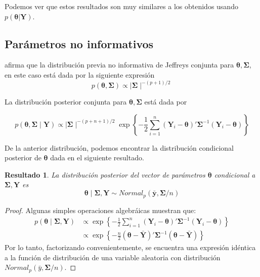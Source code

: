 \documentclass[
  10pt,
  spanish,
]{book}
\newtheorem{proposition}{Resultado}[chapter]
\theoremstyle{definition}
\theoremstyle{definition}
\theoremstyle{definition}
\theoremstyle{definition}
\theoremstyle{remark}
\begin{document}
Podemos ver que estos resultados son muy similares a los obtenidos usando \(p(\boldsymbol \theta|\mathbf{Y})\).

\hypertarget{paruxe1metros-no-informativos-1}{%
\subsection{Parámetros no informativos}\label{paruxe1metros-no-informativos-1}}

\citet{Gelman03} afirma que la distribución previa no informativa de Jeffreys conjunta para \(\boldsymbol \theta,\boldsymbol \Sigma\), en este caso está dada por la siguiente expresión
\begin{equation*}
p(\boldsymbol \theta,\boldsymbol \Sigma)\propto \mid \boldsymbol \Sigma\mid ^{-(p+1)/2}
\end{equation*}

La distribución posterior conjunta para \(\boldsymbol \theta,\boldsymbol \Sigma\) está dada por

\begin{equation*}
p(\boldsymbol \theta,\boldsymbol \Sigma\mid \mathbf{Y})\propto
\mid \boldsymbol \Sigma\mid ^{-(p+n+1)/2}
\exp\left\{ -\frac{1}{2}\sum_{i=1}^n
  (\mathbf{Y}_i-\boldsymbol \theta)'\boldsymbol \Sigma^{-1}(\mathbf{Y}_i-\boldsymbol \theta)\right\}
  \end{equation*}

De la anterior distribución, podemos encontrar la distribución condicional posterior de \(\boldsymbol \theta\) dada en el siguiente resultado.

\begin{proposition}
\protect\hypertarget{prp:unnamed-chunk-54}{}{\label{prp:unnamed-chunk-54} }La distribución posterior del vector de parámetros \(\boldsymbol \theta\) condicional a \(\boldsymbol \Sigma,\mathbf{Y}\) es
\begin{equation*}
\boldsymbol \theta\mid \boldsymbol \Sigma,\mathbf{Y}\sim Normal_p(\bar{\mathbf{y}},\boldsymbol \Sigma/n)
\end{equation*}
\end{proposition}

\begin{proof}
{}Algunas simples operaciones algebráicas muestran que:
\begin{align*}
p(\boldsymbol \theta\mid \boldsymbol \Sigma,\mathbf{Y}) &\propto \exp\left\{ -\frac{1}{2}\sum_{i=1}^n (\mathbf{Y}_i-\boldsymbol \theta)'\boldsymbol \Sigma^{-1}(\mathbf{Y}_i-\boldsymbol \theta)\right\}\\
&\propto \exp\left\{ -\frac{n}{2}(\boldsymbol \theta-\bar{\mathbf{Y}})'\boldsymbol \Sigma^{-1}(\boldsymbol \theta-\bar{\mathbf{Y}})\right\}
\end{align*}
Por lo tanto, factorizando convenientemente, se encuentra una expresión idéntica a la función de distribución de una variable aleatoria con distribución \(Normal_p(\bar{y},\boldsymbol \Sigma/n)\).
\end{proof}
\end{document}
